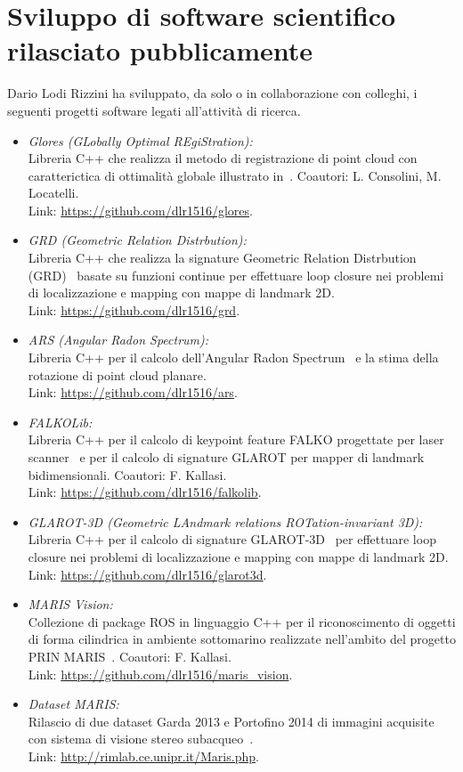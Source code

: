 \documentclass[11pt]{article}
\newcommand{\ITEMDATE}[1]{\item \textit{#1:}\\}
\begin{document}

\section*{Sviluppo di software scientifico rilasciato pubblicamente}

Dario Lodi Rizzini ha sviluppato, da solo o in collaborazione con colleghi, i seguenti progetti software legati all'attivit\`a di ricerca.
\begin{itemize}
\ITEMDATE{Glores (GLobally Optimal REgiStration)}{
  Libreria C++ che realizza il metodo di registrazione di point cloud con caratterictica di ottimalit\`a globale illustrato in~\cite{consolini2020pr}. 
  Coautori: L. Consolini, M. Locatelli. \\
  Link: \url{https://github.com/dlr1516/glores}.
}
\ITEMDATE{GRD (Geometric Relation Distrbution)}{
  Libreria C++ che realizza la signature Geometric Relation Distrbution (GRD)~\cite{lodirizzini2019ral} basate su funzioni continue per effettuare loop closure nei problemi di localizzazione e mapping con mappe di landmark 2D. \\
  Link: \url{https://github.com/dlr1516/grd}.
}
\ITEMDATE{ARS (Angular Radon Spectrum)}{
  Libreria C++ per il calcolo dell'Angular Radon Spectrum~\cite{lodirizzini2018pr} e la stima della rotazione di point cloud planare.\\
  Link: \url{https://github.com/dlr1516/ars}.
}
\ITEMDATE{FALKOLib}{
  Libreria C++ per il calcolo di keypoint feature FALKO progettate per laser scanner~\cite{kallasi2016ral} e per il calcolo di signature GLAROT per mapper di landmark bidimensionali.
  Coautori: F. Kallasi.\\
  Link: \url{https://github.com/dlr1516/falkolib}.
}
\ITEMDATE{GLAROT-3D (Geometric LAndmark relations ROTation-invariant 3D)}{
  Libreria C++ per il calcolo di signature GLAROT-3D~\cite{lodirizzini2017iros} per effettuare loop closure nei problemi di localizzazione e mapping con mappe di landmark 2D.\\
  Link: \url{https://github.com/dlr1516/glarot3d}.
}
\ITEMDATE{MARIS Vision}{
  Collezione di package ROS in linguaggio C++ per il riconoscimento di oggetti di forma cilindrica in ambiente sottomarino realizzate nell'ambito del progetto PRIN MARIS~\cite{lodirizzini2017caee, simetti2018joe}.
  Coautori: F. Kallasi.\\
  Link: \url{https://github.com/dlr1516/maris\_vision}.
}
\ITEMDATE{Dataset MARIS}{ 
  Rilascio di due dataset Garda 2013 e Portofino 2014 di immagini acquisite con sistema di visione stereo subacqueo~\cite{oleari2015oceans, lodirizzini2015ijars, oleari2014ifac}. \\
  Link: \url{http://rimlab.ce.unipr.it/Maris.php}.
}
\end{itemize}
\end{document}
